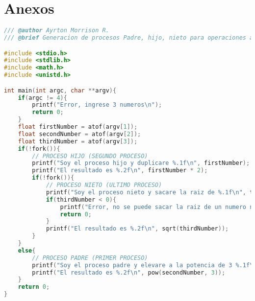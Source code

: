\section{Anexos}






\begin{lstlisting}[language=C, style=CodeStyle, caption={Uso de hijos en C por Ayrton}, label={lst:uso_de_hijos_ayrton}]
/// @author Ayrton Morrison R.
/// @brief Generacion de procesos Padre, hijo, nieto para operaciones aritmeticas.

#include <stdio.h>
#include <stdlib.h>
#include <math.h>
#include <unistd.h>

int main(int argc, char **argv){
    if(argc != 4){
        printf("Error, ingrese 3 numeros\n");
        return 0;
    }
    float firstNumber = atof(argv[1]);
    float secondNumber = atof(argv[2]);
    float thirdNumber = atof(argv[3]);
    if(!fork()){
        // PROCESO HIJO (SEGUNDO PROCESO)
        printf("Soy el proceso hijo y duplicare %.1f\n", firstNumber);
        printf("El resultado es %.2f\n", firstNumber * 2);
        if(!fork()){
            // PROCESO NIETO (ULTIMO PROCESO)
            printf("Soy el proceso nieto y sacare la raiz de %.1f\n", thirdNumber);
            if(thirdNumber < 0){
                printf("Error, no se puede sacar la raiz de un numero negativo\n");
                return 0;
            }
            printf("El resultado es %.2f\n", sqrt(thirdNumber));
        }
    }
    else{
        // PROCESO PADRE (PRIMER PROCESO)
        printf("Soy el proceso padre y elevare a la potencia de 3 %.1f\n", secondNumber);
        printf("El resultado es %.2f\n", pow(secondNumber, 3));
    }
    return 0;
}

\end{lstlisting}

